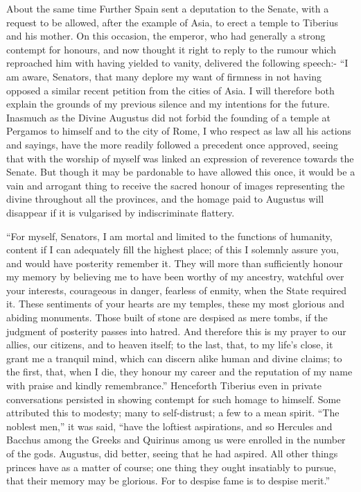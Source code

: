 
About the same time Further Spain sent a deputation to the Senate, with a request to be allowed, after the example of Asia, to erect a temple to Tiberius and his mother. On this occasion, the emperor, who had generally a strong contempt for honours, and now thought it right to reply to the rumour which reproached him with having yielded to vanity, delivered the following speech:- ``I am aware, Senators, that many deplore my want of firmness in not having opposed a similar recent petition from the cities of Asia. I will therefore both explain the grounds of my previous silence and my intentions for the future. Inasmuch as the Divine Augustus did not forbid the founding of a temple at Pergamos to himself and to the city of Rome, I who respect as law all his actions and sayings, have the more readily followed a precedent once approved, seeing that with the worship of myself was linked an expression of reverence towards the Senate. But though it may be pardonable to have allowed this once, it would be a vain and arrogant thing to receive the sacred honour of images representing the divine throughout all the provinces, and the homage paid to Augustus will disappear if it is vulgarised by indiscriminate flattery.


``For myself, Senators, I am mortal and limited to the functions of humanity, content if I can adequately fill the highest place; of this I solemnly assure you, and would have posterity remember it. They will more than sufficiently honour my memory by believing me to have been worthy of my ancestry, watchful over your interests, courageous in danger, fearless of enmity, when the State required it. These sentiments of your hearts are my temples, these my most glorious and abiding monuments. Those built of stone are despised as mere tombs, if the judgment of posterity passes into hatred. And therefore this is my prayer to our allies, our citizens, and to heaven itself; to the last, that, to my life's close, it grant me a tranquil mind, which can discern alike human and divine claims; to the first, that, when I die, they honour my career and the reputation of my name with praise and kindly remembrance.'' Henceforth Tiberius even in private conversations persisted in showing contempt for such homage to himself. Some attributed this to modesty; many to self-distrust; a few to a mean spirit. ``The noblest men,'' it was said, ``have the loftiest aspirations, and so Hercules and Bacchus among the Greeks and Quirinus among us were enrolled in the number of the gods. Augustus, did better, seeing that he had aspired. All other things princes have as a matter of course; one thing they ought insatiably to pursue, that their memory may be glorious. For to despise fame is to despise merit.''

